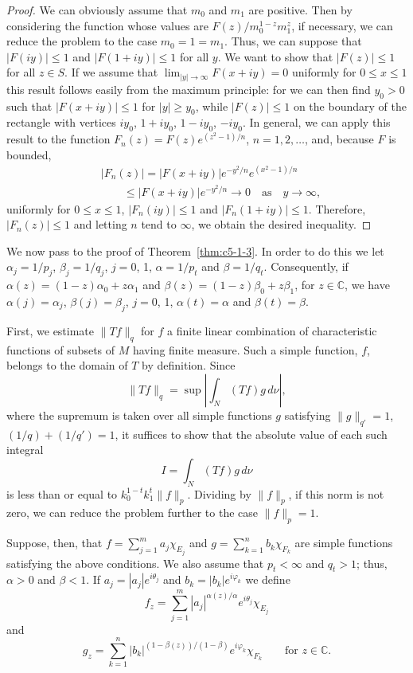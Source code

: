 \begin{proof}
We can obviously assume that $m_{0}$ and $m_{1}$ are positive. Then by
considering the function whose values are $F(z)/m_{0}^{1-z}m_{1}^{z}$, if
necessary, we can reduce the problem to the case $m_{0} = 1 = m_{1}$. Thus, we
can suppose that $|F(iy)| \leq 1$ and $|F(1 + iy)| \leq 1$ for all $y$. We want
to show that $|F(z)| \leq 1$ for all $z \in S$. If we assume that
$\lim_{|y| \to \infty}F(x + iy) = 0$ uniformly for $0 \leq x \leq 1$ this
result follows easily from the maximum principle: for we can then find
$y_{0} > 0$ such that $|F(x + iy)| \leq 1$ for $|y| \geq y_{0}$, while
$|F(z)| \leq 1$ on the boundary of the rectangle with vertices $iy_{0}$,
$1 + iy_{0}$, $1 - iy_{0}$, $-iy_{0}$. In general, we can apply this result to
the function $F_{n}(z) = F(z)e^{(z^{2}-1)/n}$, $n = 1, 2, \ldots$, and, because
$F$ is bounded,
\[
\begin{aligned}&|F_{n}(z)|=|F(x+iy)|e^{-y^{2}/n}e^{(x^{2}-1)/n}\\&\qquad\leq|F(x+iy)|e^{-y^{2}/n}\to0
\quad\text{as}\quad y\to\infty,\end{aligned}
\]
uniformly for $0 \leq x \leq 1$, $|F_{n}(iy)| \leq 1$ and
$|F_{n}(1 + iy)| \leq 1$. Therefore, $|F_{n}(z)| \leq 1$ and letting $n$ tend
to $\infty$, we obtain the desired inequality.
\end{proof}

We now pass to the proof of Theorem~\ref{thm:c5-1-3}. In order to do this we
let $\alpha_{j} = 1/p_{j}$, $\beta_{j} = 1/q_{j}$, $j = 0$, 1,
$\alpha = 1/p_{t}$ and $\beta = 1/q_{t}$. Consequently, if
$\alpha(z) = (1 - z)\alpha_{0} + z\alpha_{1}$ and
$\beta(z) = (1 - z)\beta_{0} + z\beta_{1}$, for $z \in \mathbb{C}$, we have
$\alpha(j) = \alpha_{j}$, $\beta(j) = \beta_{j}$, $j = 0$, 1, $\alpha(t) = \alpha$
and $\beta(t) = \beta$.

First, we estimate $\|Tf\|_{q}$ for $f$ a finite linear combination of
characteristic functions of subsets of $M$ having finite measure. Such a simple
function, $f$, belongs to the domain of $T$ by definition. Since
\[
\|Tf\|_{q}=\sup\left|\int_{N}(Tf)g\,d\nu\right|,
\]
where the supremum is taken over all simple functions $g$ satisfying
$\|g\|_{q'} = 1$, $(1/q) + (1/q') = 1$, it suffices to show that the absolute
value of each such integral
\[
I=\int_{N}(Tf)g\,d\nu
\]
is less than or equal to $k_{0}^{1-t}k_{1}^{t}\|f\|_{p}$. Dividing by
$\|f\|_{p}$, if this norm is not zero, we can reduce the problem further to the
case $\|f\|_{p} = 1$.

Suppose, then, that $f = \sum_{j=1}^{m}a_{j}\chi_{E_{j}}$ and
$g = \sum_{k=1}^{n}b_{k}\chi_{F_{k}}$ are simple functions satisfying the above
conditions. We also assume that $p_{t} < \infty$ and $q_{t} > 1$; thus,
$\alpha > 0$ and $\beta < 1$. If $a_{j} = |a_{j}|e^{i\theta_{j}}$ and
$b_{k} = |b_{k}|e^{i\varphi_{k}}$ we define
\[
f_{z}=\sum_{j=1}^{m}|a_{j}|^{\alpha(z)/\alpha}e^{i\theta_{j}}\chi_{E_{j}}
\]
and
\[
g_{z}=\sum_{k=1}^{n}|b_{k}|^{(1-\beta(z))/(1-\beta)}e^{i\varphi_{k}}\chi_{F_{k}}
\qquad\text{for } z \in \mathbb{C}.
\]


